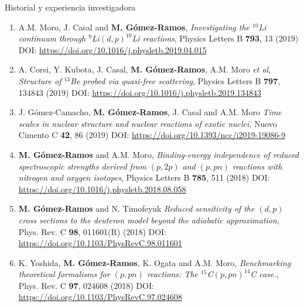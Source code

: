 \documentclass{resume2} %
\begin{document}
\begin{rSection}{Historial y experiencia investigadora}
\begin{enumerate}[label=\alph*.]
\begin{enumerate}[label=\arabic*.]

\item A.M. Moro, J. Casal and {\bf M. G\'omez-Ramos}, {\it Investigating the $^{10}$Li continuum through
$^9$Li$(d,p)^{10}$Li reactions}, Physics Letters B {\bf 793}, 13 (2019)  DOI: \url{https://doi.org/10.1016/j.physletb.2019.04.015}


\item A. Corsi, Y. Kubota, J. Casal, {\bf M. G\'omez-Ramos}, A.M. Moro \textit{et al}, {\it Structure of $^{13}$Be probed
via quasi-free scattering}, Physics Letters B {\bf 797}, 134843 (2019) DOI: \url{https://doi.org/10.1016/j.physletb.2019.134843}


\item J. G\'omez-Camacho, {\bf M. G\'omez-Ramos}, J. Casal and A.M. Moro {\it Time scales in nuclear structure and nuclear reactions of exotic nuclei}, Nuovo Cimento C {\bf 42}, 86 (2019) DOI: \url{https://doi.org/10.1393/ncc/i2019-19086-9}

\item {\bf M. G\'omez-Ramos} and A.M. Moro, {\it Binding-energy independence of reduced spectroscopic strengths derived from $(p, 2p)$ and $(p, pn)$ reactions with nitrogen and oxygen isotopes}, Physics Letters B {\bf 785}, 511 (2018) DOI: \url{https://doi.org/10.1016/j.physletb.2018.08.058}


\item {\bf M. G\'omez-Ramos} and N. Timofeyuk {\it Reduced sensitivity of the $(d,p)$ cross sections to the deuteron model beyond the adiabatic approximation}, Phys. Rev. C {\bf 98}, 011601(R) (2018) DOI: \url{https://doi.org/10.1103/PhysRevC.98.011601}


\item K. Yoshida, {\bf M. G\'omez-Ramos}, {K. Ogata} and A.M. Moro, {\it Benchmarking theoretical formalisms
for $(p,pn)$ reactions: The $^{15}$C$(p,pn) ^{14}$C case.}, Phys. Rev. C {\bf 97}, 024608 (2018) DOI: \url{https://doi.org/10.1103/PhysRevC.97.024608}



\end{enumerate}
\end{enumerate}
\end{rSection}
\end{document}
